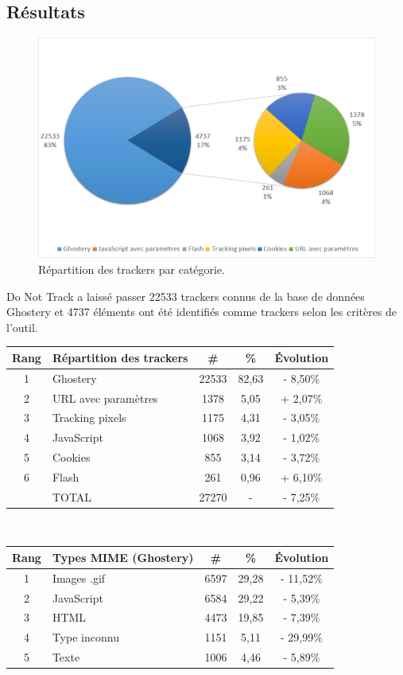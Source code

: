 \subsection{Résultats}%
\begin{figure}[!h]
	\centering
	\includegraphics[scale=.6]{resultats/ANALYSES/Images/DNT-Ghostery.png}
	\caption{\label{exp-DNT-ghostery}Répartition des trackers par catégorie.}
\end{figure}

Do Not Track a laissé passer 22533 trackers connus de la base de données Ghostery et 4737 éléments ont été identifiés comme trackers selon les critères de l'outil.\\

\begin{tabular}{ c | p{5cm} | c | c || c | }
   Rang & Répartition des trackers & \# & \% & Évolution \\
   \hline
   \hline
   1 & Ghostery & 22533 & 82,63 & - 8,50\% \\
   2 & URL avec paramètres & 1378 & 5,05 & + 2,07\% \\
   3 & Tracking pixels & 1175 & 4,31 & - 3,05\% \\
   4 & JavaScript & 1068 & 3,92 & - 1,02\% \\
   5 & Cookies & 855 & 3,14 & - 3,72\% \\
   6 & Flash & 261 & 0,96 & + 6,10\% \\
   \hline
    & TOTAL & 27270 & - & - 7,25\%\\
   \hline
\end{tabular}
\\[1cm]

\begin{tabular}{ c | p{5cm} | c | c | c | }
   Rang & Types MIME (Ghostery) & \# & \% & Évolution\\
   \hline
   \hline
   1 & Images .gif & 6597 & 29,28 & - 11,52\% \\
   2 & JavaScript & 6584 & 29,22 & - 5,39\% \\
   3 & HTML & 4473 & 19,85 & - 7,39\% \\
   4 & Type inconnu & 1151 & 5,11 & - 29,99\% \\
   5 & Texte & 1006 & 4,46 & - 5,89\% \\
   \hline
\end{tabular}
\\[.3cm]

